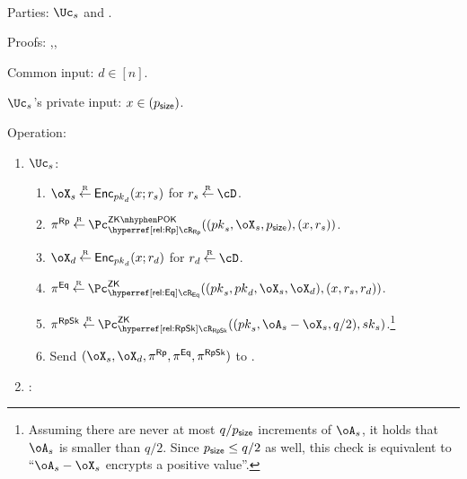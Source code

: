\begin{protocol}~\label{prot:ConfidentialTransactions:Transfer}
	\item[Parties:] $\Uc_s$ and \Cc.
	
\item[Proofs:]   \piZKPOK{\rRp},\piZK{\rRpSk},\piZK{\rEq}



	
	\item[Common input:] $d\in [n]$.
	
	\item[$\Uc_s$'s private  input:] $x \in (p_{\mathsf{size}})$.
	
\item[Operation:] ~
	

	
	\begin{enumerate}
		\item  $\Uc_s$: 
		
		\begin{enumerate}
			\item $\oX_s \getsr \Enc_{\pk_d}(x;r_s)$ for $r_s \getsr \cD$.
			
		
			\item $\pi^\RPs \getsr \pZKPOK{\rRp}((\pk_s,\oX_s,\psize),(x,r_s))$.
			
			
			\item $\oX_d \getsr \Enc_{\pk_d}(x;r_d)$ for $r_d \getsr \cD$.
			
			
		\item $\pi^\Eqs \getsr \pZK{\rEq}((\pk_s,\pk_d,\oX_s, \oX_d),(x,r_s,r_d))$.
			
			
		
			
		\item $\pi^\RpSkS \getsr \pZK{\rRpSk}((\pk_s,\oA_s- \oX_s, q/2),\sk_s)$.\footnote{Assuming there are never at most  $q/p_{\mathsf{size}}$  increments of $\oA_s$, it holds that  $\oA_s$ is smaller than $q/2$. Since $p_{\mathsf{size}} \le q/2$ as well, this check is equivalent to ``$\oA_s- \oX_s$ encrypts a positive value''. } 
			
			
			\item Send $(\oX_s,\oX_d,\pi^\RPs,\pi^\Eqs,\pi^\RpSkS)$ to \Cc.   
		\end{enumerate}
		
		
		\item  \Cc: 
		
		\begin{enumerate}
			

\end{enumerate}
\end{enumerate}
\end{protocol}
